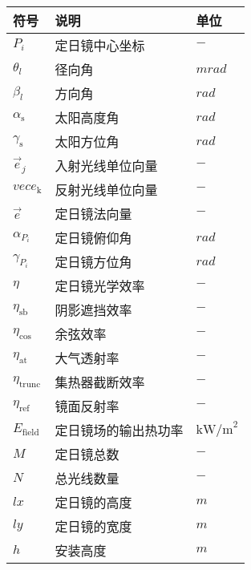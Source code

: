 \documentclass[../main.tex]{subfiles}
\begin{document}




\begin{table}[H]
    \centering
    \renewcommand{\arrayrulewidth}{2.0pt}
    \begin{tabular}{p{4cm}p{5cm}p{4cm}}
    \hline
    符号 & 说明 & 单位  \\ 
    \hline
    $P_i$         & 定日镜中心坐标         & $-$                      \\
    $\theta _l$   & 径向角                & $mrad$                   \\
    $\beta _l$    & 方向角                & $rad$                    \\
    $\alpha_{\text{s}}$      & 太阳高度角       & $rad$               \\
    $ \gamma _{\text{s}}$    & 太阳方位角       & $rad $              \\
    $\vec{e}_j$              & 入射光线单位向量  & $-$                 \\
    $vec{e}_{\text{k}}$      & 反射光线单位向量  & $-$                 \\
    $\vec{e}$                & 定日镜法向量     & $-$                  \\
    $\alpha_{P_{i}}$         & 定日镜俯仰角     & $rad$                \\
    $\gamma_{P_{i}}$         & 定日镜方位角     & $rad$                \\
    $\eta$                   & 定日镜光学效率   & $-$                   \\
    $\eta_{\text{sb}}$       & 阴影遮挡效率     &$-$                    \\
    $\eta_{\text{cos}}$      & 余弦效率        &$-$                    \\
    $\eta_{\text{at}}$       & 大气透射率       &$-$                    \\
    $\eta_{\text{trunc}}$    & 集热器截断效率   &$-$                    \\
    $\eta_{\text{ref}}$      & 镜面反射率       &$-$                    \\   
    $E_{\text{field}}$       & 定日镜场的输出热功率     &$\text{kW/m}^2$                    \\
    $M$                      & 定日镜总数     &$-$                    \\
    $N$                      & 总光线数量      &$-$                    \\
    \(lx\)                   & 定日镜的高度    &$m$                    \\
    \(ly\)                   & 定日镜的宽度    &$m$                    \\
    $h$         & 安装高度    &$m$                    \\
    \hline
    \end{tabular}
    \end{table}
\end{document}
